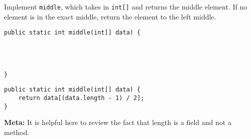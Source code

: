 \begin{blocksection}
\question Implement \lstinline$middle$, which takes in \lstinline$int[]$ and
returns the middle element. If no element is in the exact middle, return the
element to the left middle.

\ifprintanswers\else
\begin{lstlisting}
public static int middle(int[] data) {




}
\end{lstlisting}
\fi

\begin{solution}
\begin{lstlisting}
public static int middle(int[] data) {
    return data[(data.length - 1) / 2];
}
\end{lstlisting}

\textbf{Meta:} It is helpful here to review the fact that length is a field and
not a method.
\end{solution}
\end{blocksection}
